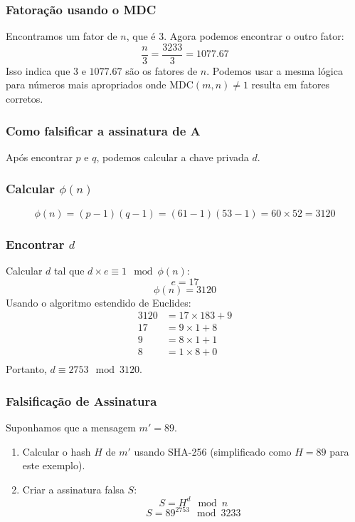 \documentclass[a4paper,12pt]{article}
\begin{document}
\subsubsection*{Fatoração usando o MDC}
Encontramos um fator de \( n \), que é 3. Agora podemos encontrar o outro fator:
\[
\frac{n}{3} = \frac{3233}{3} = 1077.67
\]
Isso indica que \( 3 \) e \( 1077.67 \) são os fatores de \( n \). Podemos usar a mesma lógica para números mais apropriados onde \( \text{MDC}(m, n) \neq 1 \) resulta em fatores corretos.

\subsubsection*{Como falsificar a assinatura de A}
Após encontrar \( p \) e \( q \), podemos calcular a chave privada \( d \).

\subsubsection*{Calcular \( \phi(n) \)}
\[
\phi(n) = (p-1)(q-1) = (61-1)(53-1) = 60 \times 52 = 3120
\]

\subsubsection*{Encontrar \( d \)}
Calcular \( d \) tal que \( d \times e \equiv 1 \mod \phi(n) \):
\[
e = 17
\]
\[
\phi(n) = 3120
\]
Usando o algoritmo estendido de Euclides:
\begin{align*}
3120 &= 17 \times 183 + 9 \\
17 &= 9 \times 1 + 8 \\
9 &= 8 \times 1 + 1 \\
8 &= 1 \times 8 + 0 \\
\end{align*}
Portanto, \( d \equiv 2753 \mod 3120 \).

\subsubsection*{Falsificação de Assinatura}
Suponhamos que a mensagem \( m' = 89 \).
\begin{enumerate}
    \item Calcular o hash \( H \) de \( m' \) usando SHA-256 (simplificado como \( H = 89 \) para este exemplo).
    \item Criar a assinatura falsa \( S \):
    \[
    S = H^d \mod n
    \]
    \[
    S = 89^{2753} \mod 3233
    \]
\end{enumerate}
\end{document}
